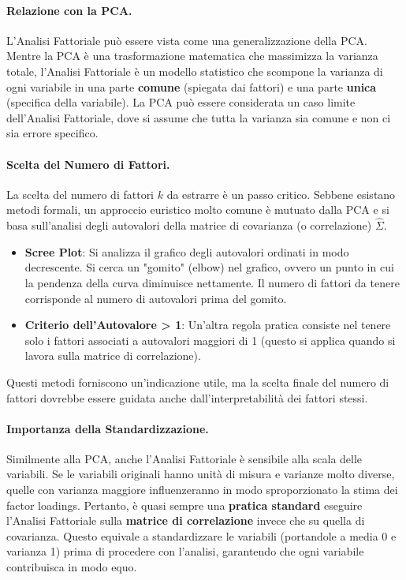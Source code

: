 \paragraph{Relazione con la PCA.}
L'Analisi Fattoriale può essere vista come una generalizzazione della PCA.
Mentre la PCA è una trasformazione matematica che massimizza la varianza
totale, l'Analisi Fattoriale è un modello statistico che scompone la varianza
di ogni variabile in una parte \textbf{comune} (spiegata dai fattori) e una
parte \textbf{unica} (specifica della variabile). La PCA può essere considerata
un caso limite dell'Analisi Fattoriale, dove si assume che tutta la varianza sia
comune e non ci sia errore specifico.

\paragraph{Scelta del Numero di Fattori.}
La scelta del numero di fattori \(k\) da estrarre è un passo critico. Sebbene
esistano metodi formali, un approccio euristico molto comune è mutuato dalla
PCA e si basa sull'analisi degli autovalori della matrice di covarianza (o
correlazione) \(\hat{\Sigma}\).
\begin{itemize}
    \item \textbf{Scree Plot}: Si analizza il grafico degli autovalori ordinati
    in modo decrescente. Si cerca un "gomito" (elbow) nel grafico, ovvero un
    punto in cui la pendenza della curva diminuisce nettamente. Il numero di
    fattori da tenere corrisponde al numero di autovalori prima del gomito.
    \item \textbf{Criterio dell'Autovalore > 1}: Un'altra regola pratica
    consiste nel tenere solo i fattori associati a autovalori maggiori di 1
    (questo si applica quando si lavora sulla matrice di correlazione).
\end{itemize}
Questi metodi forniscono un'indicazione utile, ma la scelta finale del numero di
fattori dovrebbe essere guidata anche dall'interpretabilità dei fattori stessi.

\paragraph{Importanza della Standardizzazione.}
Similmente alla PCA, anche l'Analisi Fattoriale è sensibile alla scala delle
variabili. Se le variabili originali hanno unità di misura e varianze molto
diverse, quelle con varianza maggiore influenzeranno in modo sproporzionato la
stima dei factor loadings. Pertanto, è quasi sempre una \textbf{pratica
standard} eseguire l'Analisi Fattoriale sulla \textbf{matrice di correlazione}
invece che su quella di covarianza. Questo equivale a standardizzare le
variabili (portandole a media 0 e varianza 1) prima di procedere con l'analisi,
garantendo che ogni variabile contribuisca in modo equo.

